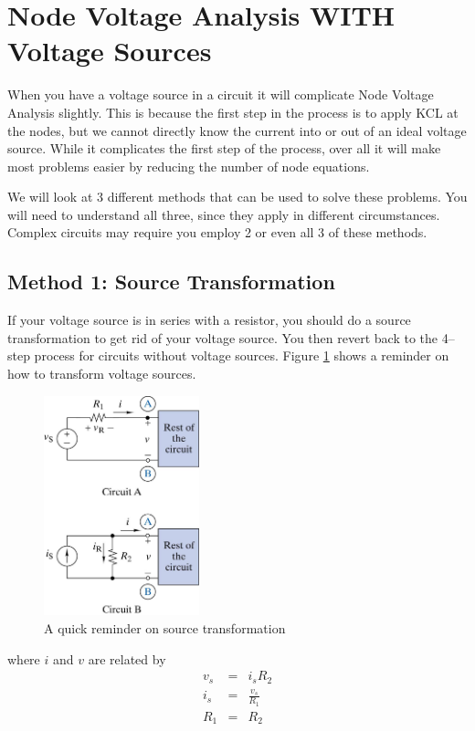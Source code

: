 \documentclass{handout}
\begin{document}
\newpage
\pagebreak
\clearpage

\section{Node Voltage Analysis WITH Voltage Sources}
When you have a voltage source in a circuit it will complicate Node Voltage Analysis slightly.  This is because the first step in the process is to apply KCL at the nodes, but we cannot directly know the current into or out of an ideal voltage source. While it complicates the first step of the process, over all it will make most problems easier by reducing the number of node equations.

We will look at 3 different methods that can be used to solve these problems.  You will need to  understand all three, since they apply in different circumstances. Complex circuits may require you employ 2 or even all 3 of these methods.

\subsection{Method 1: Source Transformation}
If your voltage source is in series with a resistor, you should do a source transformation to get rid of your voltage source.  You then revert back to the 4--step process for circuits without voltage sources. Figure \ref{fig: SourceTransformation} shows a reminder on how to transform voltage sources.
\begin{figure} [h t b]
\centering
\includegraphics[width=0.4\textwidth]{SourceTransformation.jpg}
\caption{A quick reminder on source transformation}
\label{fig: SourceTransformation}
\end{figure}

where $i$ and $v$ are related by
\begin{eqnarray}
v_s &=& i_sR_2 \nonumber \\
i_s &=& \frac{v_s}{R_1} \nonumber \\
R_1 &=& R_2 \nonumber
\end{eqnarray}
\newpage
\pagebreak
\clearpage
\end{document}

